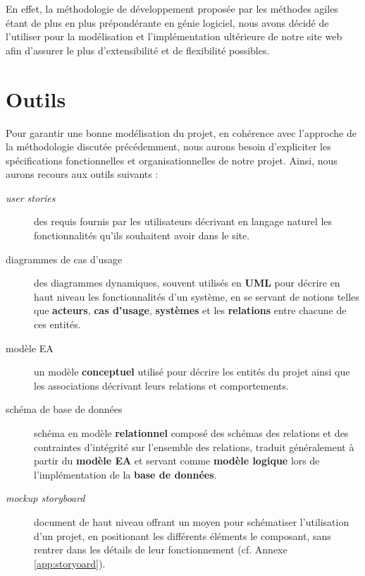 \documentclass[a4paper,12pt]{report}
\theoremstyle{break}
\theoremstyle{break}
\theoremstyle{break}
\theoremstyle{break}
\theoremstyle{definition}
\theoremstyle{remark}
\begin{document}
En effet, la méthodologie de développement proposée par les méthodes agiles étant de plus en plus prépondérante en génie logiciel, nous avons décidé de l'utiliser pour la modélisation et l'implémentation ultérieure de notre site web afin d'assurer le plus d'extensibilité et de flexibilité possibles.
\section{Outils}
Pour garantir une bonne modélisation du projet, en cohérence avec l'approche de la méthodologie discutée précédemment, nous aurons besoin d'expliciter les spécifications fonctionnelles et organisationnelles de notre projet. Ainsi, nous aurons recours aux outils suivants :
\begin{description}
  \item[\textit{user stories}]{des requis fournis par les utilisateurs décrivant en langage naturel les fonctionnalités qu'ils souhaitent avoir dans le site.}
  \item[diagrammes de cas d'usage]{des diagrammes dynamiques, souvent utilisés en \textbf{UML} pour décrire en haut niveau les fonctionnalités d'un système, en se servant de notions telles que \textbf{acteurs}, \textbf{cas d'usage}, \textbf{systèmes} et les \textbf{relations} entre chacune de ces entités.}
  \item[modèle EA]{un modèle \textbf{conceptuel} utilisé pour décrire les entités du projet ainsi que les associations décrivant leurs relations et comportements.}
  \item[schéma de base de données]{schéma en modèle \textbf{relationnel} composé des schémas des relations et des contraintes d'intégrité sur l'ensemble des relations, traduit généralement à partir du \textbf{modèle EA} et servant comme \textbf{modèle logique} lors de l'implémentation de la \textbf{base de données}.}
  \item[\textit{mockup storyboard}]{document de haut niveau offrant un moyen pour schématiser l'utilisation d'un projet, en positionant les différents éléments le composant, sans rentrer dans les détails de leur fonctionnement (cf. Annexe \ref{app:storyoard}).}
\end{description}
\end{document}
